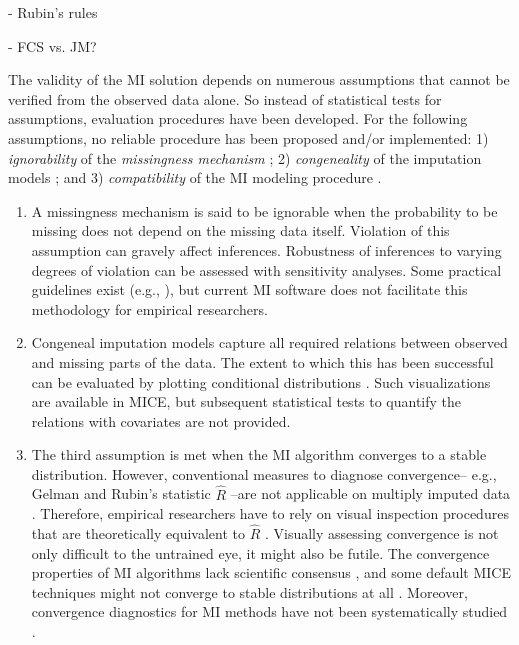 \documentclass[article]{jss}
\begin{document}
- Rubin's rules

- FCS vs. JM?

The validity of the MI solution depends on numerous assumptions that cannot be verified from the observed data alone. So instead of statistical tests for assumptions, evaluation procedures have been developed. For the following assumptions, no reliable procedure has been proposed and/or implemented: 1) \emph{ignorability} of the \emph{missingness mechanism} \citep{rubin87}; 2) \emph{congeneality} of the imputation models \citep{meng94}; and 3) \emph{compatibility} of the MI modeling procedure \citep{rubin96}. 

\begin{enumerate}
\item A missingness mechanism is said to be ignorable when the probability to be missing does not depend on the missing data itself. Violation of this assumption can gravely affect inferences. Robustness of inferences to varying degrees of violation can be assessed with sensitivity analyses. Some practical guidelines exist (e.g., \citep{nguy17}), but current MI software does not facilitate this methodology for empirical researchers. 
%
\item Congeneal imputation models capture all required relations between observed and missing parts of the data. The extent to which this has been successful can be evaluated by plotting conditional distributions \citep{abay08}. Such visualizations are available in MICE, but subsequent statistical tests to quantify the relations with covariates are not provided. 
%
\item The third assumption is met when the MI algorithm converges to a stable distribution. However, conventional measures to diagnose convergence-- e.g., Gelman and Rubin's \citeyear{gelm92} statistic $\widehat{R}$ --are not applicable on multiply imputed data \citep{lace07}. Therefore, empirical researchers have to rely on visual inspection procedures that are theoretically equivalent to $\widehat{R}$ \citep{whit11}. Visually assessing convergence is not only difficult to the untrained eye, it might also be futile. The convergence properties of MI algorithms lack scientific consensus \citep{taka17}, and some default MICE techniques might not converge to stable distributions at all \citep{murr18}. Moreover, convergence diagnostics for MI methods have not been systematically studied \citep{buur18}.
\end{enumerate}
\end{document}
